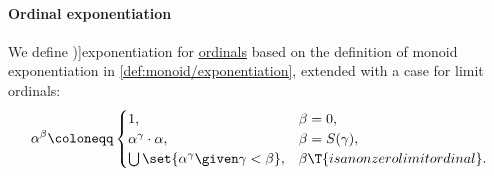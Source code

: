 \paragraph{Ordinal exponentiation}

\begin{definition}\label{def:ordinal_exponentiation}
  We define \term[en=exponentiation (\cite[def. 2.20]{Jech2006SetTheory})]{exponentiation} for \hyperref[def:ordinal]{ordinals} based on the definition of monoid exponentiation in \cref{def:monoid/exponentiation}, extended with a case for limit ordinals:
  \begin{equation*}
    \alpha^\beta \coloneqq \begin{cases}
      1,                                                  &\beta = 0, \\
      \alpha^\gamma \cdot \alpha,                         &\beta = S(\gamma), \\
      \bigcup\set{ \alpha^\gamma \given \gamma < \beta }, &\beta \T{is a nonzero limit ordinal}.
    \end{cases}
  \end{equation*}
\end{definition}

